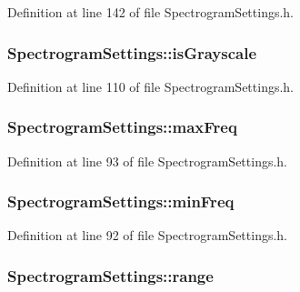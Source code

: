 Definition at line 142 of file Spectrogram\+Settings.\+h.

\subsubsection[{\texorpdfstring{is\+Grayscale}{isGrayscale}}]{ Spectrogram\+Settings\+::is\+Grayscale}\hypertarget{class_spectrogram_settings_a0d9fbcfd817862e3b021dfba3ff13ea0}{}\label{class_spectrogram_settings_a0d9fbcfd817862e3b021dfba3ff13ea0}


Definition at line 110 of file Spectrogram\+Settings.\+h.

\subsubsection[{\texorpdfstring{max\+Freq}{maxFreq}}]{ Spectrogram\+Settings\+::max\+Freq}\hypertarget{class_spectrogram_settings_a96c10597fd33d67b76c1ba5389b496e3}{}\label{class_spectrogram_settings_a96c10597fd33d67b76c1ba5389b496e3}


Definition at line 93 of file Spectrogram\+Settings.\+h.

\subsubsection[{\texorpdfstring{min\+Freq}{minFreq}}]{ Spectrogram\+Settings\+::min\+Freq}\hypertarget{class_spectrogram_settings_a2cdeae9342848e7407bf7bb9f5701d2d}{}\label{class_spectrogram_settings_a2cdeae9342848e7407bf7bb9f5701d2d}


Definition at line 92 of file Spectrogram\+Settings.\+h.

\subsubsection[{\texorpdfstring{range}{range}}]{ Spectrogram\+Settings\+::range}\hypertarget{class_spectrogram_settings_ab3c3d2f1f144d6751dacbb7b573726ef}{}\label{class_spectrogram_settings_ab3c3d2f1f144d6751dacbb7b573726ef}


